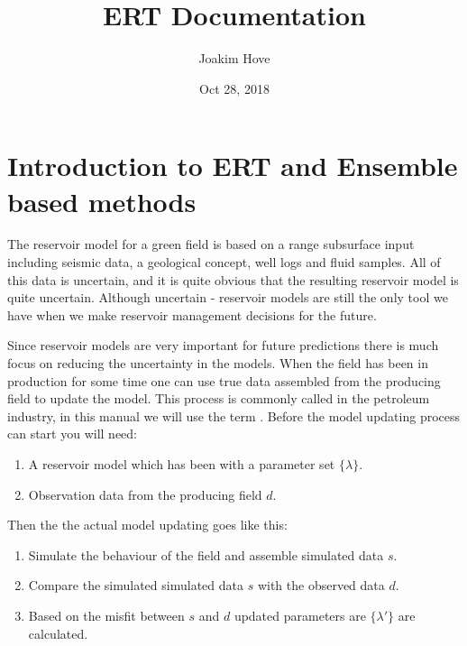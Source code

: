 \documentclass[letterpaper,10pt,english]{sphinxmanual}
\title{ERT Documentation}
\date{Oct 28, 2018}
\author{Joakim Hove}
\begin{document}
\maketitle
\sphinxtableofcontents
{}\label{\detokenize{manual::doc}}



\chapter{Introduction to ERT and Ensemble based methods}
\label{\detokenize{introduction/index:introduction-to-ert-and-ensemble-based-methods}}\label{\detokenize{introduction/index::doc}}\label{\detokenize{introduction/index:welcome-to-ert-s-documentation}}
The reservoir model for a green field is based on a range subsurface input
including seismic data, a geological concept, well logs and fluid samples. All
of this data is uncertain, and it is quite obvious that the resulting reservoir
model is quite uncertain. Although uncertain - reservoir models are still the
only tool we have when we make reservoir management decisions for the future.

Since reservoir models are very important for future predictions there is much
focus on reducing the uncertainty in the models. When the field has been in
production for some time one can use true data assembled from the producing
field to update the model. This process is commonly called  in
the petroleum industry, in this manual we will use the term .
Before the model updating process can start you will need:
\begin{enumerate}
\item {} 
A reservoir model which has been  with a parameter set
\(\{\lambda\}\).

\item {} 
Observation data from the producing field \(d\).

\end{enumerate}

Then the the actual model updating goes like this:
\begin{enumerate}
\item {} 
Simulate the behaviour of the field and assemble simulated data \(s\).

\item {} 
Compare the simulated simulated data \(s\) with the observed data \(d\).

\item {} 
Based on the misfit between \(s\) and \(d\) updated parameters are
\(\{\lambda'\}\) are calculated.

\end{enumerate}
\end{document}
